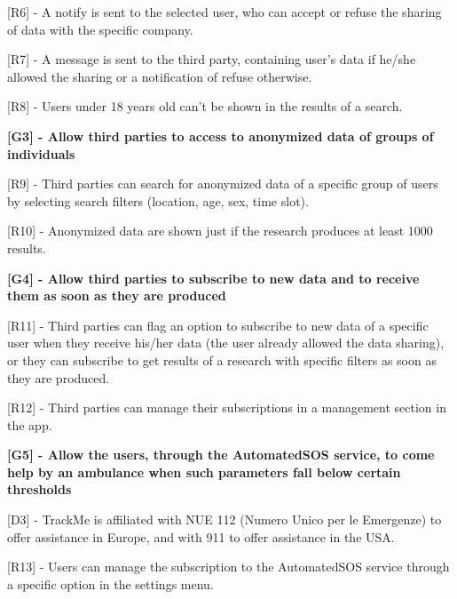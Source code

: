 [R6] - A notify is sent to the selected user, who can accept or refuse the sharing of data with the specific company. \newline

[R7] - A message is sent to the third party, containing user's data if he/she allowed the sharing or a notification of refuse otherwise. \newline

[R8] - Users under 18 years old can't be shown in the results of a search. \newline

\hspace{-\parindent}\textbf{[G3] - Allow third parties to access to anonymized data of groups of individuals} \newline

[R9] - Third parties can search for anonymized data of a specific group of users by selecting search filters (location, age, sex, time slot). \newline

[R10] - Anonymized data are shown just if the research produces at least 1000 results. \newline

\hspace{-\parindent}\textbf{[G4] - Allow third parties to subscribe to new data and to receive them as soon as they are produced} \newline

[R11] - Third parties can flag an option to subscribe to new data of a specific user when they receive his/her data (the user already allowed the data sharing), or they can subscribe to get results of a research with specific filters as soon as they are produced. \newline

[R12] - Third parties can manage their subscriptions in a management section in the app. \newline

\hspace{-\parindent}\textbf{[G5] - Allow the users, through the AutomatedSOS service, to come help by an ambulance when such parameters fall below certain thresholds} \newline

[D3] - TrackMe is affiliated with NUE 112 (Numero Unico per le Emergenze) to offer assistance in Europe, and with 911 to offer assistance in the USA. \newline

[R13] - Users can manage the subscription to the AutomatedSOS service through a specific option in the settings menu. \newline

